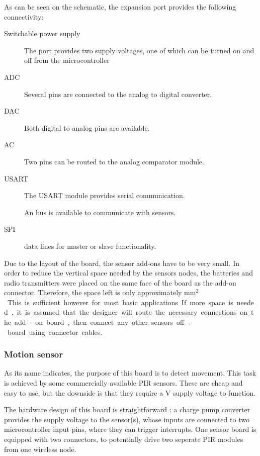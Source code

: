 As can be seen on the schematic, the expansion port provides the following
connectivity:
\begin{description}
  \item [Switchable power supply] The port provides two supply voltages, one of
    which can be turned on and off from the microcontroller
  \item[ADC] Several pins are connected to the analog to digital converter.
  \item[DAC] Both digital to analog pins are available.
  \item[AC] Two pins can be routed to the analog comparator module.
  \item[USART] The USART module provides serial communication.
  \item[\IIC{}] An \IIC{} bus is available to communicate with sensors.
  \item[SPI] data lines for master or slave functionality.
\end{description}

Due to the layout of the board, the sensor add-ons have to be very small. In
order to reduce the vertical space needed by the sensors nodes, the batteries
and radio transmitters were placed on the same face of the board as the add-on
connector. Therefore, the space left is only approximately \unit[25x25]{mm$^2$}.
This is sufficient however for most basic applications. If more space is needed,
it is assumed that the designer will route the necessary connections on the
add-on board, then connect any other sensors off-board using connector cables.


\subsubsection{Motion sensor}


As its name indicates, the purpose of this board is to detect movement. This
task is achieved by some commercially available PIR sensors. These are cheap and
easy to use, but the downside is that they require a \unit[5]{V} supply voltage
to function.

The hardware design of this board is straightforward : a charge pump converter
provides the supply voltage to the sensor(s), whose inputs are connected to two
microcontroller input pins, where they can trigger interrupts. One sensor board
is equipped with two connectors, to potentially drive two seperate PIR modules
from one wireless node.

